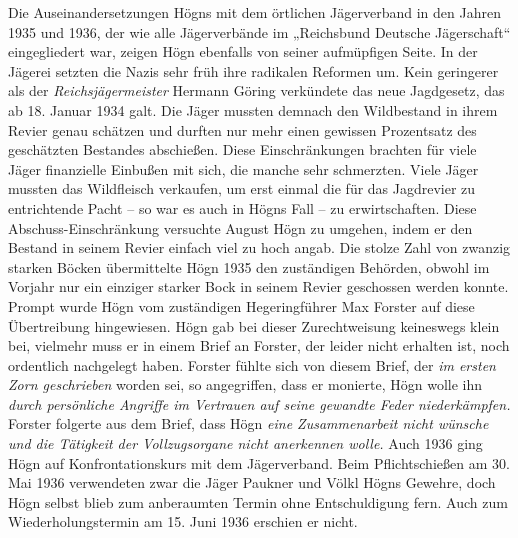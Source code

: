 \documentclass{book}
\begin{document}
Die Auseinandersetzungen Högns mit dem örtlichen Jägerverband in den
Jahren 1935 und 1936, der wie alle Jägerverbände im „Reichsbund
Deutsche Jägerschaft“ eingegliedert war, zeigen Högn ebenfalls von
seiner aufmüpfigen Seite. In der Jägerei setzten die Nazis sehr früh
ihre radikalen Reformen um. Kein geringerer als der
\textit{Reichsjägermeister} Hermann Göring verkündete das neue
Jagdgesetz, das ab 18. Januar 1934 galt. Die Jäger mussten demnach den
Wild\-bestand in ihrem Revier genau schätzen und durften nur mehr einen
gewissen Prozentsatz des geschätzten Bestandes abschießen. Diese
Einschränkungen brachten für viele Jäger finanzielle Einbußen mit sich,
die manche sehr schmerzten. Viele Jäger mussten das Wildfleisch
verkaufen, um erst einmal die für das Jagdrevier zu entrichtende Pacht
– so war es auch in Högns Fall – zu erwirtschaften. Diese
Abschuss-Einschränkung versuchte August Högn zu umgehen, indem er den
Bestand in seinem Revier einfach viel zu hoch angab. Die stolze Zahl
von zwanzig starken Böcken übermittelte Högn 1935 den zu\-ständigen
Behörden, obwohl im Vorjahr nur ein einziger starker Bock in sei\-nem
Revier geschossen werden konnte. Prompt wurde Högn vom zustän\-digen
Hegeringführer Max Forster auf diese Übertreibung hingewiesen. Högn gab
bei dieser Zurechtweisung keineswegs klein bei, vielmehr muss er in
einem Brief an Forster, der leider nicht erhalten ist, noch ordentlich
nachge\-legt haben. Forster fühlte sich von diesem Brief, der
\textit{im ersten Zorn geschrieben }worden sei, so angegriffen, dass er
monierte, Högn wolle ihn \textit{durch persönliche Angriffe im
Vertrauen auf seine gewandte Feder niederkämpfen.} Forster folgerte aus
dem Brief, dass Högn \textit{eine Zusammenarbeit nicht wünsche und die
Tätigkeit der Vollzugsorgane nicht anerkennen wolle. }Auch 1936 ging
Högn auf Konfrontationskurs mit dem Jägerverband. Beim Pflichtschießen
am 30. Mai 1936 verwendeten zwar die Jäger Paukner und Völkl Högns
Gewehre, doch Högn selbst blieb zum anberaumten Termin ohne
Entschuldigung fern. Auch zum Wiederholungstermin am 15. Juni 1936
erschien er nicht.


\end{document}
